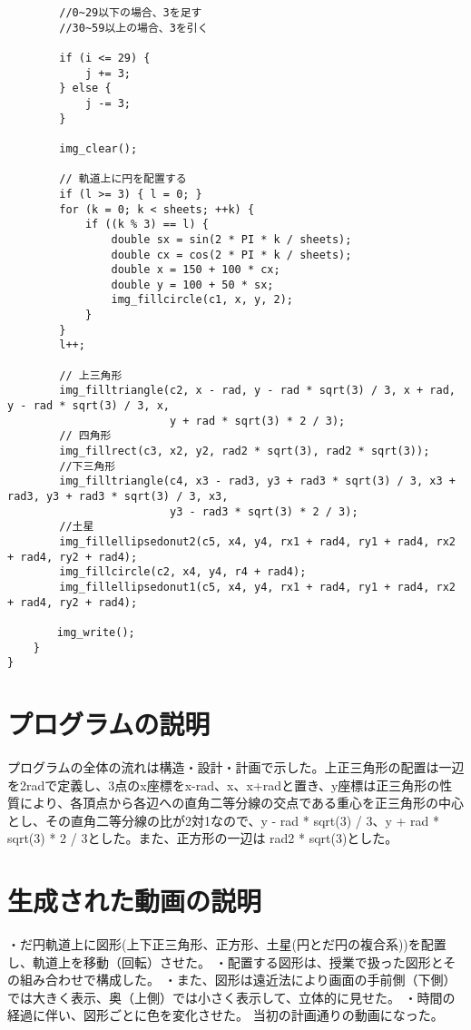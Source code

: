 \documentclass[12pt,a4j]{jarticle}
\begin{document}
\begin{verbatim}
        //0~29以下の場合、3を足す
        //30~59以上の場合、3を引く

        if (i <= 29) {
            j += 3;
        } else {
            j -= 3;
        }

        img_clear();

        // 軌道上に円を配置する
        if (l >= 3) { l = 0; }
        for (k = 0; k < sheets; ++k) {
            if ((k % 3) == l) {
                double sx = sin(2 * PI * k / sheets);
                double cx = cos(2 * PI * k / sheets);
                double x = 150 + 100 * cx;
                double y = 100 + 50 * sx;
                img_fillcircle(c1, x, y, 2);
            }
        }
        l++;

        // 上三角形
        img_filltriangle(c2, x - rad, y - rad * sqrt(3) / 3, x + rad, y - rad * sqrt(3) / 3, x,
                         y + rad * sqrt(3) * 2 / 3);
        // 四角形
        img_fillrect(c3, x2, y2, rad2 * sqrt(3), rad2 * sqrt(3));
        //下三角形
        img_filltriangle(c4, x3 - rad3, y3 + rad3 * sqrt(3) / 3, x3 + rad3, y3 + rad3 * sqrt(3) / 3, x3,
                         y3 - rad3 * sqrt(3) * 2 / 3);
        //土星
        img_fillellipsedonut2(c5, x4, y4, rx1 + rad4, ry1 + rad4, rx2 + rad4, ry2 + rad4);
        img_fillcircle(c2, x4, y4, r4 + rad4);
        img_fillellipsedonut1(c5, x4, y4, rx1 + rad4, ry1 + rad4, rx2 + rad4, ry2 + rad4);

      　img_write();
    }
}

\end{verbatim}

\section{プログラムの説明}

プログラムの全体の流れは構造・設計・計画で示した。上正三角形の配置は一辺を2radで定義し、3点のx座標をx-rad、x、x+radと置き、y座標は正三角形の性質により、各頂点から各辺への直角二等分線の交点である重心を正三角形の中心とし、その直角二等分線の比が2対1なので、y - rad * sqrt(3) / 3、y + rad * sqrt(3) * 2 / 3とした。また、正方形の一辺は rad2 * sqrt(3)とした。

\section{生成された動画の説明} 

・だ円軌道上に図形(上下正三角形、正方形、土星(円とだ円の複合系))を配置し、軌道上を移動（回転）させた。
・配置する図形は、授業で扱った図形とその組み合わせで構成した。
・また、図形は遠近法により画面の手前側（下側）では大きく表示、奥（上側）では小さく表示して、立体的に見せた。
・時間の経過に伴い、図形ごとに色を変化させた。
当初の計画通りの動画になった。
\end{document}
